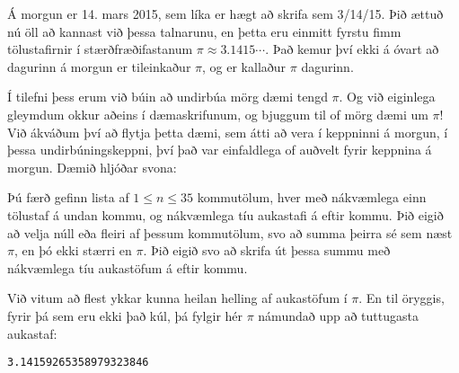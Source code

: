 

Á morgun er 14. mars 2015, sem líka er hægt að skrifa sem 3/14/15. Þið ættuð nú
öll að kannast við þessa talnarunu, en þetta eru einmitt fyrstu fimm
tölustafirnir í stærðfræðifastanum $\pi \approx 3.1415\cdots$. Það kemur því
ekki á óvart að dagurinn á morgun er tileinkaður $\pi$, og er kallaður $\pi$
dagurinn.

Í tilefni þess erum við búin að undirbúa mörg dæmi tengd $\pi$. Og við
eiginlega gleymdum okkur aðeins í dæmaskrifunum, og bjuggum til of mörg dæmi um
$\pi$! Við ákváðum því að flytja þetta dæmi, sem átti að vera í keppninni á
morgun, í þessa undirbúningskeppni, því það var einfaldlega of auðvelt fyrir
keppnina á morgun. Dæmið hljóðar svona:

Þú færð gefinn lista af $1 \leq n \leq 35$ kommutölum, hver með nákvæmlega einn
tölustaf á undan kommu, og nákvæmlega tíu aukastafi á eftir kommu. Þið eigið að
velja núll eða fleiri af þessum kommutölum, svo að summa þeirra sé sem næst
$\pi$, en þó ekki stærri en $\pi$. Þið eigið svo að skrifa út þessa summu með
nákvæmlega tíu aukastöfum á eftir kommu.

Við vitum að flest ykkar kunna heilan helling af aukastöfum í $\pi$. En til
öryggis, fyrir þá sem eru ekki það kúl, þá fylgir hér $\pi$ námundað upp að
tuttugasta aukastaf:

\begin{verbatim}
3.14159265358979323846
\end{verbatim}


